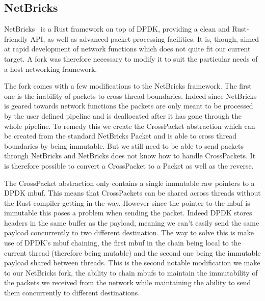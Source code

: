 \documentclass[11pt]{article}
\begin{document}
\subsection{NetBricks}
NetBricks~\cite{netbricks} is a Rust framework on top of DPDK,
providing a clean and Rust-friendly API, as well as advanced packet
processing facilities. It is, though, aimed at rapid development of
network functions which does not quite fit our current target. A fork
was therefore necessary to modify it to suit the particular needs of a
host networking framework.

The fork comes with a few modifications to the NetBricks
framework. The first one is the inability of packets to cross thread
boundaries. Indeed since NetBricks is geared towards network functions
the packets are only meant to be processed by the user defined
pipeline and is deallocated after it has gone through the whole
pipeline. To remedy this we create the CrossPacket abstraction which
can be created from the standard NetBricks Packet and is able to cross
thread boundaries by being immutable. But we still need to be able to
send packets through NetBricks and NetBricks does not know how to
handle CrossPackets. It is therefore possible to convert a CrossPacket
to a Packet as well as the reverse.

The CrossPacket abstraction only contains a single immutable raw
pointers to a DPDK mbuf. This means that CrossPackets can be shared
across threads without the Rust compiler getting in the way. However
since the pointer to the mbuf is immutable this poses a problem when
sending the packet. Indeed DPDK stores headers in the same buffer as
the payload, meaning we can't easily send the same payload
concurrently to two different destination. The way to solve this is
make use of DPDK's mbuf chaining, the first mbuf in the chain being
local to the current thread (therefore being mutable) and the second
one being the immutable payload shared between threads. This is the
second notable modification we make to our NetBricks fork, the ability
to chain mbufs to maintain the immutability of the packets we received
from the network while maintaining the ability to send them
concurrently to different destinations.
\end{document}
